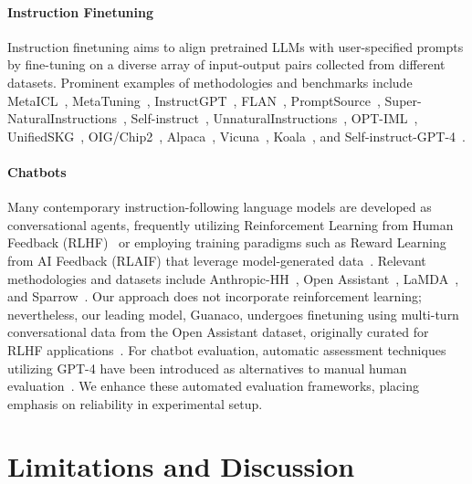 \paragraph{Instruction Finetuning} Instruction finetuning aims to align pretrained LLMs with user-specified prompts by fine-tuning on a diverse array of input-output pairs collected from different datasets. Prominent examples of methodologies and benchmarks include MetaICL~\citep{min2021metaicl}, MetaTuning~\citep{zhong2021adapting}, InstructGPT~\citep{ouyang2022training}, FLAN~\citep{wei2021finetuned,chung2022scaling}, PromptSource~\citep{bach2022promptsource}, Super-NaturalInstructions~\citep{wang2022super,sanh2021multitask}, Self-instruct~\citep{wang2022self}, UnnaturalInstructions~\citep{honovich2022unnatural}, OPT-IML~\citep{iyer2022opt}, UnifiedSKG~\citep{xie2022unifiedskg}, OIG/Chip2~\citep{laion2023}, Alpaca~\citep{alpaca}, Vicuna~\citep{vicuna2023}, Koala~\citep{koala_blogpost_2023}, and Self-instruct-GPT-4~\citep{peng2023instruction}.

\paragraph{Chatbots} Many contemporary instruction-following language models are developed as conversational agents, frequently utilizing Reinforcement Learning from Human Feedback (RLHF)~\citep{christiano2017deep} or employing training paradigms such as Reward Learning from AI Feedback (RLAIF) that leverage model-generated data~\citep{bai2022constitutional}. Relevant methodologies and datasets include Anthropic-HH~\citep{askell2021general,bai2022training}, Open Assistant~\citep{kopf2023openassistant}, LaMDA~\citep{thoppilan2022lamda}, and Sparrow~\citep{glaese2022improving}. Our approach does not incorporate reinforcement learning; nevertheless, our leading model, Guanaco, undergoes finetuning using multi-turn conversational data from the Open Assistant dataset, originally curated for RLHF applications~\citep{kopf2023openassistant}. For chatbot evaluation, automatic assessment techniques utilizing GPT-4 have been introduced as alternatives to manual human evaluation~\citep{vicuna2023,peng2023instruction}. We enhance these automated evaluation frameworks, placing emphasis on reliability in experimental setup.

\section{Limitations and Discussion}

